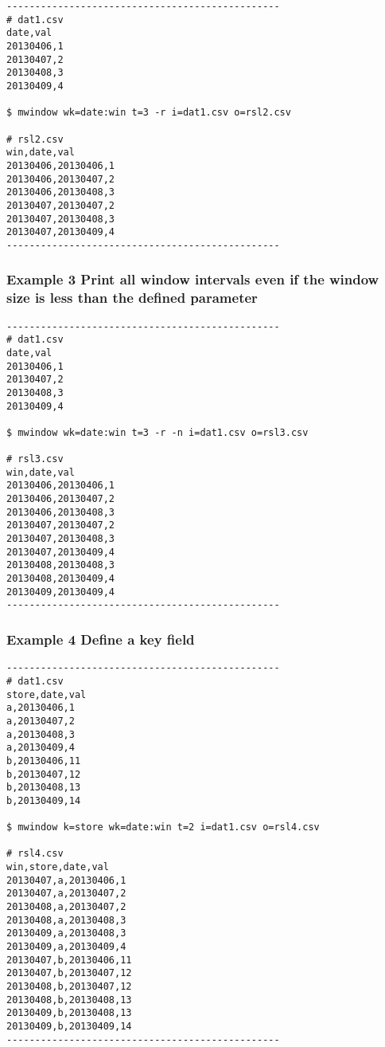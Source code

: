 \documentclass[a4paper]{jarticle}
\begin{document}
\begin{verbatim}
------------------------------------------------
# dat1.csv
date,val
20130406,1
20130407,2
20130408,3
20130409,4

$ mwindow wk=date:win t=3 -r i=dat1.csv o=rsl2.csv

# rsl2.csv
win,date,val
20130406,20130406,1
20130406,20130407,2
20130406,20130408,3
20130407,20130407,2
20130407,20130408,3
20130407,20130409,4
------------------------------------------------
\end{verbatim}

\subsubsection*{Example 3 Print all window intervals even if the window size is less than the defined parameter}

\begin{verbatim}
------------------------------------------------
# dat1.csv
date,val
20130406,1
20130407,2
20130408,3
20130409,4

$ mwindow wk=date:win t=3 -r -n i=dat1.csv o=rsl3.csv

# rsl3.csv
win,date,val
20130406,20130406,1
20130406,20130407,2
20130406,20130408,3
20130407,20130407,2
20130407,20130408,3
20130407,20130409,4
20130408,20130408,3
20130408,20130409,4
20130409,20130409,4
------------------------------------------------
\end{verbatim}

\subsubsection*{Example 4 Define a key field}

\begin{verbatim}
------------------------------------------------
# dat1.csv
store,date,val
a,20130406,1
a,20130407,2
a,20130408,3
a,20130409,4
b,20130406,11
b,20130407,12
b,20130408,13
b,20130409,14

$ mwindow k=store wk=date:win t=2 i=dat1.csv o=rsl4.csv

# rsl4.csv
win,store,date,val
20130407,a,20130406,1
20130407,a,20130407,2
20130408,a,20130407,2
20130408,a,20130408,3
20130409,a,20130408,3
20130409,a,20130409,4
20130407,b,20130406,11
20130407,b,20130407,12
20130408,b,20130407,12
20130408,b,20130408,13
20130409,b,20130408,13
20130409,b,20130409,14
------------------------------------------------
\end{verbatim}
\end{document}
